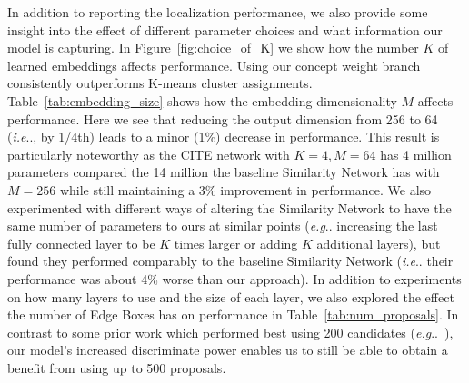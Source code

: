 \documentclass[runningheads]{llncs}
\makeatletter
\DeclareRobustCommand\onedot{\futurelet\@let@token\@onedot}
\def\@onedot{\ifx\@let@token.\else.\null\fi\xspace}
\def\eg{\emph{e.g}\onedot} \def\Eg{\emph{E.g}\onedot}
\def\ie{\emph{i.e}\onedot} \def\Ie{\emph{I.e}\onedot}
\makeatother
\begin{document}
\begin{table*}[t]
\end{table*} In addition to reporting the localization performance, we also provide some insight into the effect of different parameter choices and what information our model is capturing.  In Figure~\ref{fig:choice_of_K} we show how the number $K$ of learned embeddings affects performance.  Using our concept weight branch consistently outperforms K-means cluster assignments.  Table~\ref{tab:embedding_size} shows how the embedding dimensionality $M$ affects performance.  Here we see that reducing the output dimension from 256 to 64 (\ie, by 1/4th) leads to a minor (1\%) decrease in performance.  This result is particularly noteworthy as the CITE network with $K=4, M=64$ has 4 million parameters compared the 14 million the baseline Similarity Network has with $M=256$ while still maintaining a 3\% improvement in performance.  We also experimented with different ways of altering the Similarity Network to have the same number of parameters to ours at similar points (\eg increasing the last fully connected layer to be $K$ times larger or adding $K$ additional layers), but found they performed comparably to the baseline Similarity Network (\ie their performance was about 4\% worse than our approach).  In addition to experiments on how many layers to use and  the size of each layer, we also explored the effect the number of Edge Boxes has on performance in Table~\ref{tab:num_proposals}.  In contrast to some prior work which performed best using 200 candidates (\eg~\cite{flickrentitiesijcv,plummerPLCLC2017}), our model's increased discriminate power enables us to still be able to obtain a benefit from using up to 500 proposals.
\end{document}
